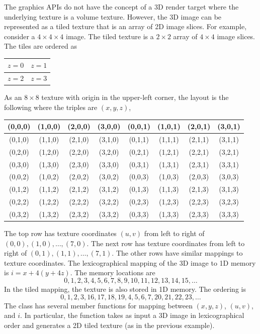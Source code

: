 \documentclass{article}
\begin{document}
The graphics APIs do not have the concept of a 3D render target where the
underlying texture is a volume texture.  However, the 3D image can be represented
as a tiled texture that is an array of 2D image slices.  For example, consider
a $4 \times 4 \times 4$ image.  The tiled texture is a $2 \times 2$ array of
$4 \times 4$ image slices.  The tiles are ordered as
\begin{center}
  \begin{tabular}{|c|c|} \hline
    $z = 0$ & $z = 1$ \\ \hline
    $z = 2$ & $z = 3$ \\ \hline
  \end{tabular}
\end{center}
As an $8 \times 8$ texture with origin in the upper-left corner, the layout is
the following where the triples are $(x,y,z)$,
\begin{center}
  \begin{tabular}{|c|c|c|c|c|c|c|c|} \hline
    (0,0,0) & (1,0,0) & (2,0,0) & (3,0,0) & (0,0,1) & (1,0,1) & (2,0,1) & (3,0,1) \\ \hline
    (0,1,0) & (1,1,0) & (2,1,0) & (3,1,0) & (0,1,1) & (1,1,1) & (2,1,1) & (3,1,1) \\ \hline
    (0,2,0) & (1,2,0) & (2,2,0) & (3,2,0) & (0,2,1) & (1,2,1) & (2,2,1) & (3,2,1) \\ \hline
    (0,3,0) & (1,3,0) & (2,3,0) & (3,3,0) & (0,3,1) & (1,3,1) & (2,3,1) & (3,3,1) \\ \hline
    (0,0,2) & (1,0,2) & (2,0,2) & (3,0,2) & (0,0,3) & (1,0,3) & (2,0,3) & (3,0,3) \\ \hline
    (0,1,2) & (1,1,2) & (2,1,2) & (3,1,2) & (0,1,3) & (1,1,3) & (2,1,3) & (3,1,3) \\ \hline
    (0,2,2) & (1,2,2) & (2,2,2) & (3,2,2) & (0,2,3) & (1,2,3) & (2,2,3) & (3,2,3) \\ \hline
    (0,3,2) & (1,3,2) & (2,3,2) & (3,3,2) & (0,3,3) & (1,3,3) & (2,3,3) & (3,3,3) \\ \hline
  \end{tabular}
\end{center}
The top row has texture coordinates $(u,v)$ from left to right of $(0,0),
(1,0), \ldots, (7,0)$.  The next row has texture coordinates from left to
right of $(0,1), (1,1), \ldots, (7,1)$.  The other rows have similar mappings
to texture coordinates.  The lexicographical mapping of the 3D image to 1D
memory is $i = x + 4(y + 4z)$.  The memory locations are
\[
  0, 1, 2, 3, 4, 5, 6, 7, 8, 9, 10, 11, 12, 13, 14, 15, \ldots
\]
In the tiled mapping, the texture is also stored in 1D memory.  The ordering
is
\[
  0, 1, 2, 3, 16, 17, 18, 19, 4, 5, 6, 7, 20, 21, 22, 23, \ldots
\]
The  class has several member functions for mapping
between $(x,y,z)$, $(u,v)$, and $i$.  In particular, the function
 takes as input a 3D image in lexicographical order
and generates a 2D tiled texture (as in the previous example).
\end{document}

